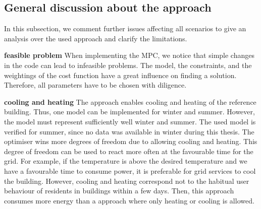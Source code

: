 \subsection{General discussion about the approach}
\label{subsec:General discussion about the approach}
In this subsection, we comment further issues affecting all scenarios to give an analysis over the used approach and clarify the limitations.\newline

\textbf{feasible problem}\newline
When implementing the MPC, we notice that simple changes in the code can lead to infeasible problems. The model, the constraints, and the weightings of the cost function have a great influence on finding a solution. Therefore, all parameters have to be chosen with diligence.\newline

\textbf{cooling and heating}\newline
The approach enables cooling and heating of the reference building. Thus, one model can be implemented for winter and summer. However, the model must represent sufficiently well winter and summer. The used model is verified for summer, since no data was available in winter during this thesis.
The optimiser wins more degrees of freedom due to allowing cooling and heating. This degree of freedom can be used to react more often at the favourable time for the grid. For example, if the temperature is above the desired temperature and we have a favourable time to consume power, it is preferable for grid services to cool the building.
However, cooling and heating correspond not to the habitual user behaviour of residents in buildings within a few days. Then, this approach consumes more energy than a approach where only heating or cooling is allowed.


%
